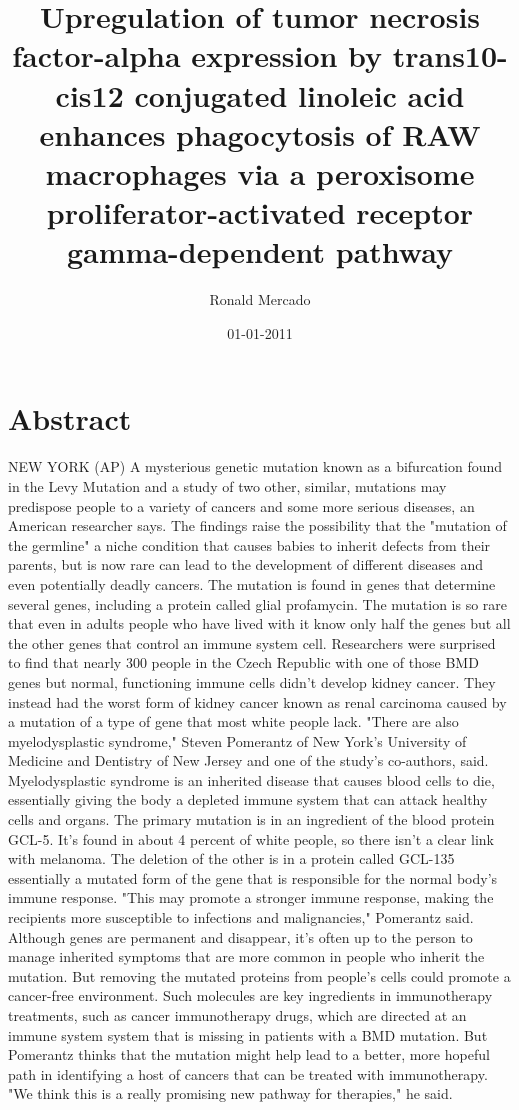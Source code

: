 \documentclass{article}%
\title{Upregulation of tumor necrosis factor{-}alpha expression by trans10{-}cis12 conjugated linoleic acid enhances phagocytosis of RAW macrophages via a peroxisome proliferator{-}activated receptor gamma{-}dependent pathway}%
\author{Ronald Mercado}%
\affil{Institute of Bioinformatics and Biosignal Transduction, College of Bioscience and Biotechnology, National Cheng{-}Kung University, Tainan, Taiwan}%
\date{01{-}01{-}2011}%
\begin{document}
%
\normalsize%
\maketitle%
\section{Abstract}%
\label{sec:Abstract}%
NEW YORK (AP)  A mysterious genetic mutation known as a bifurcation found in the Levy Mutation and a study of two other, similar, mutations may predispose people to a variety of cancers and some more serious diseases, an American researcher says.\newline%
The findings raise the possibility that the "mutation of the germline"  a niche condition that causes babies to inherit defects from their parents, but is now rare  can lead to the development of different diseases and even potentially deadly cancers. The mutation is found in genes that determine several genes, including a protein called glial profamycin. The mutation is so rare that even in adults people who have lived with it know only half the genes but all the other genes that control an immune system cell.\newline%
Researchers were surprised to find that nearly 300 people in the Czech Republic with one of those BMD genes but normal, functioning immune cells didn't develop kidney cancer. They instead had the worst form of kidney cancer known as renal carcinoma  caused by a mutation of a type of gene that most white people lack.\newline%
"There are also myelodysplastic syndrome," Steven Pomerantz of New York's University of Medicine and Dentistry of New Jersey and one of the study's co{-}authors, said. Myelodysplastic syndrome is an inherited disease that causes blood cells to die, essentially giving the body a depleted immune system that can attack healthy cells and organs.\newline%
The primary mutation is in an ingredient of the blood protein GCL{-}5. It's found in about 4 percent of white people, so there isn't a clear link with melanoma. The deletion of the other is in a protein called GCL{-}135  essentially a mutated form of the gene that is responsible for the normal body's immune response.\newline%
"This may promote a stronger immune response, making the recipients more susceptible to infections and malignancies," Pomerantz said.\newline%
Although genes are permanent and disappear, it's often up to the person to manage inherited symptoms that are more common in people who inherit the mutation. But removing the mutated proteins from people's cells could promote a cancer{-}free environment.\newline%
Such molecules are key ingredients in immunotherapy treatments, such as cancer immunotherapy drugs, which are directed at an immune system system that is missing in patients with a BMD mutation. But Pomerantz thinks that the mutation might help lead to a better, more hopeful path in identifying a host of cancers that can be treated with immunotherapy.\newline%
"We think this is a really promising new pathway for therapies," he said.
\end{document}

